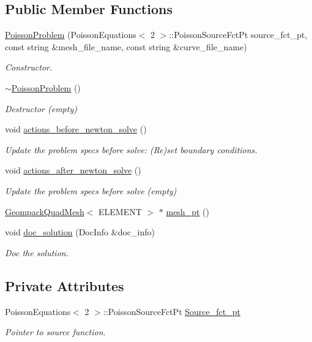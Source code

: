 \subsection*{Public Member Functions}
\begin{DoxyCompactItemize}
\item 
\hyperlink{classPoissonProblem_a488c280759ef72e059de0fcd72cf4413}{Poisson\+Problem} (Poisson\+Equations$<$ 2 $>$\+::Poisson\+Source\+Fct\+Pt source\+\_\+fct\+\_\+pt, const string \&mesh\+\_\+file\+\_\+name, const string \&curve\+\_\+file\+\_\+name)
\begin{DoxyCompactList}\small\item\em Constructor. \end{DoxyCompactList}\item 
\hyperlink{classPoissonProblem_ac247e42d2d292200617f4b9db7ed1ab8}{$\sim$\+Poisson\+Problem} ()
\begin{DoxyCompactList}\small\item\em Destructor (empty) \end{DoxyCompactList}\item 
void \hyperlink{classPoissonProblem_a398608a5ff73b74c5a387b3f794c58df}{actions\+\_\+before\+\_\+newton\+\_\+solve} ()
\begin{DoxyCompactList}\small\item\em Update the problem specs before solve\+: (Re)set boundary conditions. \end{DoxyCompactList}\item 
void \hyperlink{classPoissonProblem_a7a9478d8e1e5c7d3a886b00ab7d50bbd}{actions\+\_\+after\+\_\+newton\+\_\+solve} ()
\begin{DoxyCompactList}\small\item\em Update the problem specs before solve (empty) \end{DoxyCompactList}\item 
\hyperlink{classoomph_1_1GeompackQuadMesh}{Geompack\+Quad\+Mesh}$<$ E\+L\+E\+M\+E\+NT $>$ $\ast$ \hyperlink{classPoissonProblem_a8191a1eb8d55778aa7264856285b5d7f}{mesh\+\_\+pt} ()
\item 
void \hyperlink{classPoissonProblem_aab6f503fa242f687bb8452527bb7688f}{doc\+\_\+solution} (Doc\+Info \&doc\+\_\+info)
\begin{DoxyCompactList}\small\item\em Doc the solution. \end{DoxyCompactList}\end{DoxyCompactItemize}
\subsection*{Private Attributes}
\begin{DoxyCompactItemize}
\item 
Poisson\+Equations$<$ 2 $>$\+::Poisson\+Source\+Fct\+Pt \hyperlink{classPoissonProblem_a32b954cca3c38175d0816f92e1c0da46}{Source\+\_\+fct\+\_\+pt}
\begin{DoxyCompactList}\small\item\em Pointer to source function. \end{DoxyCompactList}\end{DoxyCompactItemize}


